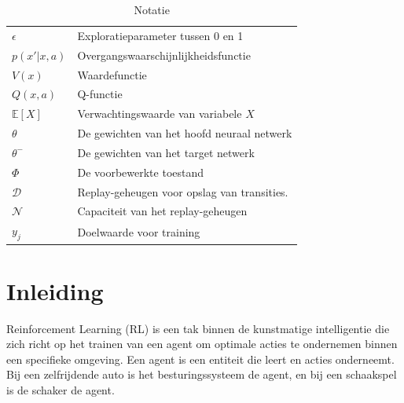 \documentclass[a4paper,11pt]{report}-
\begin{document}
\begin{table}[h]
\begin{tabular}{>{\raggedright}p{2.5cm} >{\raggedright\arraybackslash}p{10cm}}
        $\epsilon$               & Exploratieparameter tussen 0 en 1           \\
        $p(x'|x, a)$             & Overgangswaarschijnlijkheidsfunctie         \\
        $V(x)$                   & Waardefunctie                               \\
        $Q(x, a)$                & Q-functie                                   \\
        $\mathbb{E}[X]$          & Verwachtingswaarde van variabele $X$        \\
        $\theta$                 & De gewichten van het hoofd neuraal netwerk  \\
        $\theta^-$               & De gewichten van het target netwerk         \\
        $\Phi$                   & De voorbewerkte toestand                    \\
        $\mathcal{D}$            & Replay-geheugen voor opslag van transities. \\
        $\mathcal{N}$            & Capaciteit van het replay-geheugen          \\
        $y_j$                    & Doelwaarde voor training                    \\

    \end{tabular}
    \caption{Notatie}
\end{table}

\newpage

\chapter{Inleiding}
Reinforcement Learning (RL) is een tak binnen de kunstmatige intelligentie die
zich richt op het trainen van een agent om optimale acties te ondernemen binnen
een specifieke omgeving. Een agent is een entiteit die leert en acties
onderneemt. Bij een zelfrijdende auto is het besturingssysteem de agent, en bij
een schaakspel is de schaker de agent.
\end{document}
